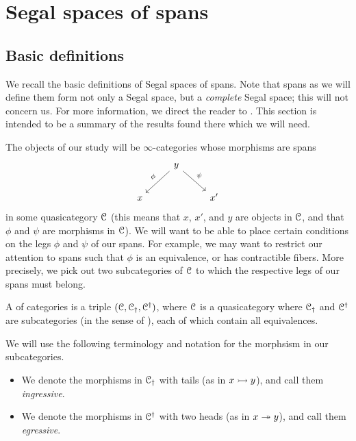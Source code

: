 \documentclass[main.tex]{subfiles}
\begin{document}
\section{Segal spaces of spans}
\label{sec:segal_spaces_of_spans}

\subsection{Basic definitions}

We recall the basic definitions of Segal spaces of spans. Note that spans as we will define them form not only a Segal space, but a \emph{complete} Segal space; this will not concern us. For more information, we direct the reader to \cite{spectralmackeyfunctors1}. This section is intended to be a summary of the results found there which we will need.

The objects of our study will be $\infty$-categories whose morphisms are spans
\begin{equation*}
  \begin{tikzcd}
    & y
    \arrow[dl, swap, "\phi"]
    \arrow[dr, "\psi"]
    \\
    x
    && x'
  \end{tikzcd}
\end{equation*}
in some quasicategory $\mathcal{C}$ (this means that $x$, $x'$, and $y$ are objects in $\mathcal{C}$, and that $\phi$ and $\psi$ are morphisms in $\mathcal{C}$). We will want to be able to place certain conditions on the legs $\phi$ and $\psi$ of our spans. For example, we may want to restrict our attention to spans such that $\phi$ is an equivalence, or has contractible fibers. More precisely, we pick out two subcategories of $\mathcal{C}$ to which the respective legs of our spans must belong.

\begin{definition}
  A  of categories is a triple $(\mathcal{C}, \mathcal{C}_{\dagger}, \mathcal{C}^{\dagger})$, where $\mathcal{C}$ is a quasicategory where $\mathcal{C}_{\dagger}$ and $\mathcal{C}^{\dagger}$ are subcategories (in the sense of \cite[Sec.\ 1.2.11]{highertopostheory}), each of which contain all equivalences.
\end{definition}

We will use the following terminology and notation for the morphsism in our subcategories.
\begin{itemize}
  \item We denote the morphisms in $\mathcal{C}_{\dagger}$ with tails (as in $x \rightarrowtail y$), and call them \emph{ingressive}.

  \item We denote the morphisms in $\mathcal{C}^{\dagger}$ with two heads (as in $x \twoheadrightarrow y$), and call them \emph{egressive}.
\end{itemize}
\end{document}
